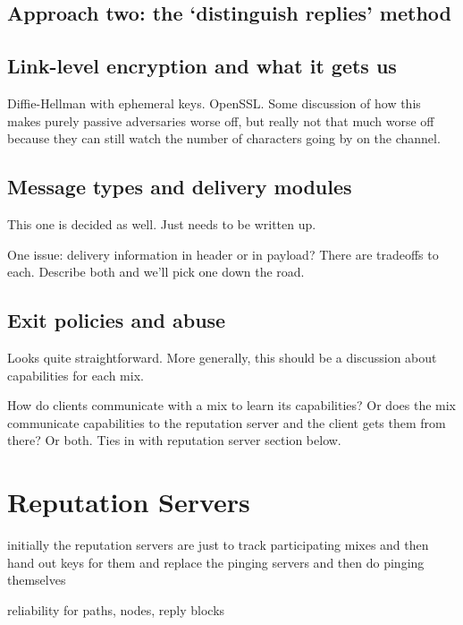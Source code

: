 \documentclass{llncs}
\begin{document}
\subsection{Approach two: the `distinguish replies' method}


\subsection{Link-level encryption and what it gets us}

Diffie-Hellman with ephemeral keys. OpenSSL. Some discussion of how
this makes purely passive adversaries worse off, but really not that
much worse off because they can still watch the number of characters
going by on the channel.

\subsection{Message types and delivery modules}

This one is decided as well. Just needs to be written up.

One issue: delivery information in header or in payload?
There are tradeoffs to each. Describe both and we'll pick one down the road.

\subsection{Exit policies and abuse}

Looks quite straightforward. More generally, this should be a discussion
about capabilities for each mix.

How do clients communicate with a mix to learn its capabilities? Or does
the mix communicate capabilities to the reputation server and the client
gets them from there? Or both. Ties in with reputation server section
below.


\section{Reputation Servers}
\label{sec:rep-servers}

initially the reputation servers are just to track participating
mixes
and then hand out keys for them
and replace the pinging servers
and then do pinging themselves

reliability for paths, nodes, reply blocks
\end{document}
